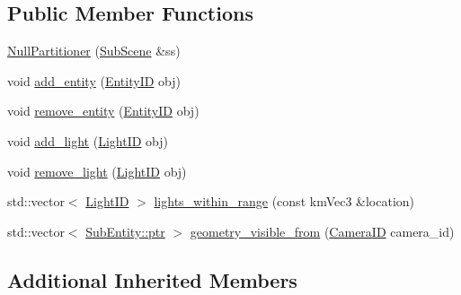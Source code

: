 \subsection*{Public Member Functions}
\begin{DoxyCompactItemize}
\item 
\hyperlink{classkglt_1_1_null_partitioner_a6d911af23be27e78b6a8bfe1405f9eda}{Null\-Partitioner} (\hyperlink{classkglt_1_1_sub_scene}{Sub\-Scene} \&ss)
\item 
void \hyperlink{classkglt_1_1_null_partitioner_a5817ca6bd49d3919b925dcb34184b5e4}{add\-\_\-entity} (\hyperlink{namespacekglt_a693458ae13c224ae3ea4074ac3a0b02a}{Entity\-I\-D} obj)
\item 
void \hyperlink{classkglt_1_1_null_partitioner_aba3c2036704213be010dc02acf18772d}{remove\-\_\-entity} (\hyperlink{namespacekglt_a693458ae13c224ae3ea4074ac3a0b02a}{Entity\-I\-D} obj)
\item 
void \hyperlink{classkglt_1_1_null_partitioner_a78905d24117425e97083aafeaa1b0578}{add\-\_\-light} (\hyperlink{namespacekglt_ab90464803ef8e3c1f6da41388e859968}{Light\-I\-D} obj)
\item 
void \hyperlink{classkglt_1_1_null_partitioner_ade8f71865086ba9aad1e771ebbd84cdb}{remove\-\_\-light} (\hyperlink{namespacekglt_ab90464803ef8e3c1f6da41388e859968}{Light\-I\-D} obj)
\item 
std\-::vector$<$ \hyperlink{namespacekglt_ab90464803ef8e3c1f6da41388e859968}{Light\-I\-D} $>$ \hyperlink{classkglt_1_1_null_partitioner_a79ca0020c1fcb4dbbe4573c4fcbcb11a}{lights\-\_\-within\-\_\-range} (const km\-Vec3 \&location)
\item 
std\-::vector$<$ \hyperlink{class_managed_a59aa857eaf753735f65130812e98e9a9}{Sub\-Entity\-::ptr} $>$ \hyperlink{classkglt_1_1_null_partitioner_a158823b8b97b3de39861665d37eacc9b}{geometry\-\_\-visible\-\_\-from} (\hyperlink{namespacekglt_a2a2b79f136b052b58ec737bd9c885429}{Camera\-I\-D} camera\-\_\-id)
\end{DoxyCompactItemize}
\subsection*{Additional Inherited Members}


